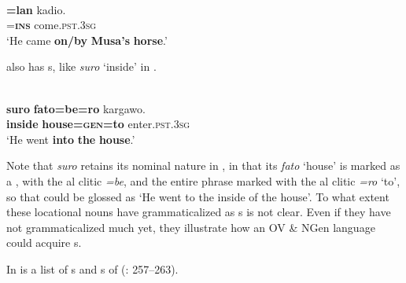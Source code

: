 \documentclass[output=paper]{langsci/langscibook}
\begin{document}
\ea\label{ex:dryer:33}
\\
\gll [\textbf{fər}  \textbf{Musa=be}]\textbf{=lan}  kadio.\\
       [\textbf{horse}  \textbf{Musa=\textsc{gen}}]=\textbf{\textsc{ins}}  come.\textsc{pst}.3\textsc{sg}  \\
\glt ‘He came \textbf{on/by} \textbf{Musa’s} \textbf{horse}.’
\z

\noindent {} also has s, like \textit{suro} ‘inside’ in .

\ea\label{ex:dryer:34}
\\
\gll   \textbf{suro}  \textbf{fato=be=ro}  kargawo.\\
       \textbf{inside}  \textbf{house=\textsc{gen}}\textbf{=to}  enter.\textsc{pst}.3\textsc{sg} \\
\glt   ‘He went \textbf{into} \textbf{the} \textbf{house}.’
\z

\noindent Note that \textit{suro} retains its nominal nature in , in that its  \textit{fato} ‘house’ is marked as a , with the  al clitic \textit{=be}, and the entire phrase marked with the al clitic \textit{=ro} ‘to’, so that  could be glossed as ‘He went to the inside of the house’. To what extent these locational nouns have grammaticalized as s is not clear. Even if they have not grammaticalized much yet, they illustrate how an OV \& NGen language could acquire s.

In  is a list of s and s of  (\citealt{Hutchinson1981}: 257–263).
\end{document}
